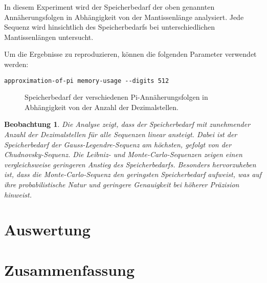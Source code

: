 \documentclass{scrartcl}
\newtheorem{approximation sequence}{Annäherungsfolge}
\newtheorem{observation}{Beobachtung}
\begin{document}
In diesem Experiment wird der Speicherbedarf der oben genannten
Annäherungsfolgen in Abhängigkeit von der Mantissenlänge analysiert. Jede
Sequenz wird hinsichtlich des Speicherbedarfs bei unterschiedlichen
Mantissenlängen untersucht.

Um die Ergebnisse zu reproduzieren, können die folgenden Parameter verwendet
werden:
\begin{verbatim}
approximation-of-pi memory-usage --digits 512
\end{verbatim}

\begin{figure}[H]
    \centering
    
    \caption{Speicherbedarf der verschiedenen Pi-Annäherungsfolgen in Abhängigkeit von der Anzahl der Dezimalstellen.}
    \label{fig:memory-usage}
\end{figure}

\begin{observation}
    Die Analyse zeigt, dass der Speicherbedarf mit zunehmender Anzahl der
    Dezimalstellen für alle Sequenzen linear ansteigt.
    Dabei ist der Speicherbedarf der Gauss-Legendre-Sequenz am höchsten, gefolgt
    von der Chudnovsky-Sequenz.
    Die Leibniz- und Monte-Carlo-Sequenzen zeigen einen vergleichsweise geringeren
    Anstieg des Speicherbedarfs.
    Besonders hervorzuheben ist, dass die Monte-Carlo-Sequenz den geringsten
    Speicherbedarf aufweist, was auf ihre probabilistische Natur und geringere
    Genauigkeit bei höherer Präzision hinweist.
\end{observation}

\section{Auswertung}

\section{Zusammenfassung}

\printbibliography
\end{document}
